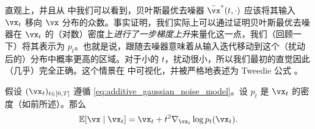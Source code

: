 \documentclass[../../book-main_zh.tex]{subfiles}
\begin{document}
直观上，并且从  中我们可以看到，贝叶斯最优去噪器 \(\bar{\vx}^{\ast}(t, \cdot)\) 应该将其输入 \(\vx_{t}\) 移向 \(\vx\) 分布的众数。事实证明，我们实际上可以通过证明贝叶斯最优去噪器在 \(\vx_{t}\) 的（对数）密度上\textit{进行了一步梯度上升}来量化这一点，我们（回顾一下）将其表示为 \(p_{t}\)。也就是说，跟随去噪器意味着从输入迭代移动到这个（扰动后的）分布中概率更高的区域。对于小的 \(t\)，扰动很小，所以我们最初的直觉因此（几乎）完全正确。这个情景在  中可视化，并被严格地表述为 Tweedie 公式 \cite{Robbins1956AnEB}。
\begin{theorem}[Tweedie 公式]\label{thm:tweedie}
	假设 \((\vx_{t})_{t \in [0, T]}\) 遵循 \eqref{eq:additive_gaussian_noise_model}。设 \(p_{t}\) 是 \(\vx_{t}\) 的密度（如前所述）。那么
	\begin{equation}\label{eq:tweedie}
		\Ex[\vx \mid \vx_{t}] = \vx_{t} + t^{2}\nabla_{\vx_{t}} \log p_{t}(\vx_{t}).
	\end{equation}
\end{theorem}
\end{document}
